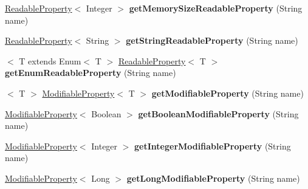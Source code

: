 \begin{DoxyCompactItemize}
\mbox{\hyperlink{interfacecom_1_1mysql_1_1cj_1_1conf_1_1_readable_property}{Readable\+Property}}$<$ Integer $>$ {\bfseries get\+Memory\+Size\+Readable\+Property} (String name)
\item 
\mbox{\label{interfacecom_1_1mysql_1_1cj_1_1conf_1_1_property_set_ada03117e402138c98ba25e336e83d9a2}} 
\mbox{\hyperlink{interfacecom_1_1mysql_1_1cj_1_1conf_1_1_readable_property}{Readable\+Property}}$<$ String $>$ {\bfseries get\+String\+Readable\+Property} (String name)
\item 
\mbox{\label{interfacecom_1_1mysql_1_1cj_1_1conf_1_1_property_set_a01113d885888a4c9a4ac334af5f2deae}} 
$<$ T extends Enum$<$ T $>$ \mbox{\hyperlink{interfacecom_1_1mysql_1_1cj_1_1conf_1_1_readable_property}{Readable\+Property}}$<$ T $>$ {\bfseries get\+Enum\+Readable\+Property} (String name)
\item 
\mbox{\label{interfacecom_1_1mysql_1_1cj_1_1conf_1_1_property_set_a1f0bf657fdc759cd12424b7820811aac}} 
$<$ T $>$ \mbox{\hyperlink{interfacecom_1_1mysql_1_1cj_1_1conf_1_1_modifiable_property}{Modifiable\+Property}}$<$ T $>$ {\bfseries get\+Modifiable\+Property} (String name)
\item 
\mbox{\label{interfacecom_1_1mysql_1_1cj_1_1conf_1_1_property_set_acb80d7a26b31af0bdaf61158268f8655}} 
\mbox{\hyperlink{interfacecom_1_1mysql_1_1cj_1_1conf_1_1_modifiable_property}{Modifiable\+Property}}$<$ Boolean $>$ {\bfseries get\+Boolean\+Modifiable\+Property} (String name)
\item 
\mbox{\label{interfacecom_1_1mysql_1_1cj_1_1conf_1_1_property_set_a23c7b32f5aa0b61cd6b23ae0a712673b}} 
\mbox{\hyperlink{interfacecom_1_1mysql_1_1cj_1_1conf_1_1_modifiable_property}{Modifiable\+Property}}$<$ Integer $>$ {\bfseries get\+Integer\+Modifiable\+Property} (String name)
\item 
\mbox{\label{interfacecom_1_1mysql_1_1cj_1_1conf_1_1_property_set_a19570f2efd6239cdacbf6628113b574f}} 
\mbox{\hyperlink{interfacecom_1_1mysql_1_1cj_1_1conf_1_1_modifiable_property}{Modifiable\+Property}}$<$ Long $>$ {\bfseries get\+Long\+Modifiable\+Property} (String name)

\end{DoxyCompactItemize}
